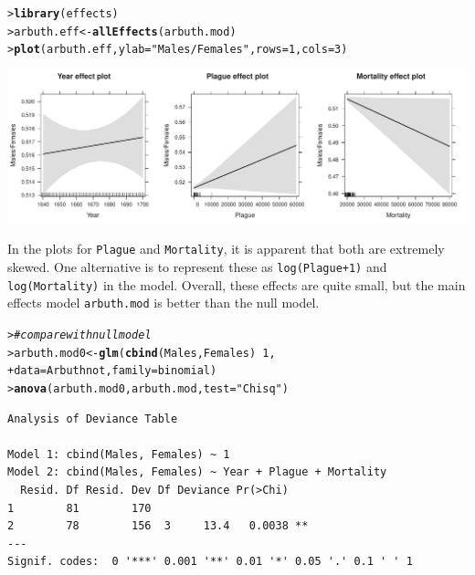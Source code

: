 \documentclass[10pt]{report}\usepackage[]{graphicx}\usepackage[]{color}
\makeatletter
\newcommand{\hlnum}[1]{\textcolor[rgb]{0.686,0.059,0.569}{#1}}%
\newcommand{\hlstr}[1]{\textcolor[rgb]{0.192,0.494,0.8}{#1}}%
\newcommand{\hlcom}[1]{\textcolor[rgb]{0.678,0.584,0.686}{\textit{#1}}}%
\newcommand{\hlopt}[1]{\textcolor[rgb]{0,0,0}{#1}}%
\newcommand{\hlstd}[1]{\textcolor[rgb]{0.345,0.345,0.345}{#1}}%
\newcommand{\hlkwb}[1]{\textcolor[rgb]{0.69,0.353,0.396}{#1}}%
\newcommand{\hlkwc}[1]{\textcolor[rgb]{0.333,0.667,0.333}{#1}}%
\newcommand{\hlkwd}[1]{\textcolor[rgb]{0.737,0.353,0.396}{\textbf{#1}}}%
\newenvironment{kframe}{%
 \def\at@end@of@kframe{}%
 \ifinner\ifhmode%
  \def\at@end@of@kframe{\end{minipage}}%
  \begin{minipage}{\columnwidth}%
 \fi\fi%
 \def\FrameCommand##1{\hskip\@totalleftmargin \hskip-\fboxsep
 \colorbox{shadecolor}{##1}\hskip-\fboxsep
     \hskip-\linewidth \hskip-\@totalleftmargin \hskip\columnwidth}%
 \MakeFramed {\advance\hsize-\width
   \@totalleftmargin\z@ \linewidth\hsize
   \@setminipage}}%
 {\par\unskip\endMakeFramed%
 \at@end@of@kframe}
\newenvironment{knitrout}{}{} %
\renewenvironment{knitrout}{\small\renewcommand{\baselinestretch}{.85}}{} %
\makeatother
\begin{document}
\begin{Exercises}
\begin{ans}
\begin{knitrout}\footnotesize
{}\color{fgcolor}\begin{kframe}
\begin{alltt}
\hlstd{> }\hlkwd{library}\hlstd{(effects)}
\hlstd{> }\hlstd{arbuth.eff} \hlkwb{<-} \hlkwd{allEffects}\hlstd{(arbuth.mod)}
\hlstd{> }\hlkwd{plot}\hlstd{(arbuth.eff,} \hlkwc{ylab}\hlstd{=}\hlstr{"Males/Females"}\hlstd{,} \hlkwc{rows}\hlstd{=}\hlnum{1}\hlstd{,} \hlkwc{cols}\hlstd{=}\hlnum{3}\hlstd{)}
\end{alltt}
\end{kframe}

\centerline{\includegraphics[width=\textwidth]{soln/fig/ex7_1b-1} }



\end{knitrout}
    In the plots for \texttt{Plague} and \texttt{Mortality}, it is apparent that both are extremely
    skewed.  One alternative is to represent these as \texttt{log(Plague+1)} and
    \texttt{log(Mortality)} in the model.  Overall, these effects are quite small, 
    but the main effects model \texttt{arbuth.mod} is better than the null model.
    
\begin{knitrout}\footnotesize
{}\color{fgcolor}\begin{kframe}
\begin{alltt}
\hlstd{> }  \hlcom{# compare with null model}
\hlstd{> }\hlstd{arbuth.mod0} \hlkwb{<-} \hlkwd{glm}\hlstd{(}\hlkwd{cbind}\hlstd{(Males, Females)} \hlopt{~} \hlnum{1}\hlstd{,}
\hlstd{+ }                   \hlkwc{data}\hlstd{=Arbuthnot,} \hlkwc{family}\hlstd{=binomial)}
\hlstd{> }\hlkwd{anova}\hlstd{(arbuth.mod0, arbuth.mod,} \hlkwc{test}\hlstd{=}\hlstr{"Chisq"}\hlstd{)}
\end{alltt}
\begin{verbatim}
Analysis of Deviance Table

Model 1: cbind(Males, Females) ~ 1
Model 2: cbind(Males, Females) ~ Year + Plague + Mortality
  Resid. Df Resid. Dev Df Deviance Pr(>Chi)   
1        81        170                        
2        78        156  3     13.4   0.0038 **
---
Signif. codes:  0 '***' 0.001 '**' 0.01 '*' 0.05 '.' 0.1 ' ' 1
\end{verbatim}
\end{kframe}
\end{knitrout}
	\end{ans}


\end{Exercises}
\end{document}

